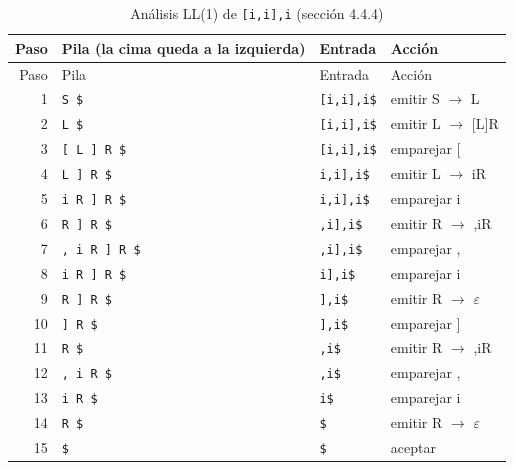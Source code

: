 \documentclass[11pt,a4paper]{article}
\begin{document}
\begin{longtable}{r p{4.6cm} p{2.6cm} p{5cm}}
\caption{Análisis LL(1) de \texttt{{[}i,i{]},i} (sección 4.4.4)}\\
\toprule
Paso & Pila (la cima queda a la izquierda) & Entrada & Acción \\
\midrule
\endfirsthead
\toprule
Paso & Pila & Entrada & Acción \\
\midrule
\endhead
1 & \texttt{S \$} & \texttt{{[}i,i{]},i\$} & emitir S $\to$ L \\
2 & \texttt{L \$} & \texttt{{[}i,i{]},i\$} & emitir L $\to$ {[}L{]}R \\
3 & \texttt{{[} L {]} R \$} & \texttt{{[}i,i{]},i\$} & emparejar {[} \\
4 & \texttt{L {]} R \$} & \texttt{i,i{]},i\$} & emitir L $\to$ iR \\
5 & \texttt{i R {]} R \$} & \texttt{i,i{]},i\$} & emparejar i \\
6 & \texttt{R {]} R \$} & \texttt{,i{]},i\$} & emitir R $\to$ ,iR \\
7 & \texttt{, i R {]} R \$} & \texttt{,i{]},i\$} & emparejar , \\
8 & \texttt{i R {]} R \$} & \texttt{i{]},i\$} & emparejar i \\
9 & \texttt{R {]} R \$} & \texttt{{]},i\$} & emitir R $\to$ $\varepsilon$ \\
10 & \texttt{{]} R \$} & \texttt{{]},i\$} & emparejar {]} \\
11 & \texttt{R \$} & \texttt{,i\$} & emitir R $\to$ ,iR \\
12 & \texttt{, i R \$} & \texttt{,i\$} & emparejar , \\
13 & \texttt{i R \$} & \texttt{i\$} & emparejar i \\
14 & \texttt{R \$} & \texttt{\$} & emitir R $\to$ $\varepsilon$ \\
15 & \texttt{\$} & \texttt{\$} & aceptar  \\
\bottomrule
\end{longtable}
\end{document}
